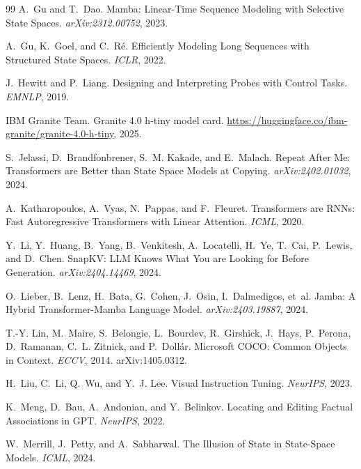 \begin{thebibliography}{99}
A.~Gu and T.~Dao.
\newblock Mamba: Linear-Time Sequence Modeling with Selective State Spaces.
\emph{arXiv:2312.00752}, 2023.

A.~Gu, K.~Goel, and C.~R\'e.
\newblock Efficiently Modeling Long Sequences with Structured State Spaces.
\emph{ICLR}, 2022.

J.~Hewitt and P.~Liang.
\newblock Designing and Interpreting Probes with Control Tasks.
\emph{EMNLP}, 2019.

IBM Granite Team.
\newblock Granite 4.0 h-tiny model card.
\newblock \url{https://huggingface.co/ibm-granite/granite-4.0-h-tiny}, 2025.

S.~Jelassi, D.~Brandfonbrener, S.~M. Kakade, and E.~Malach.
\newblock Repeat After Me: Transformers are Better than State Space Models at
Copying. \emph{arXiv:2402.01032}, 2024.

A.~Katharopoulos, A.~Vyas, N.~Pappas, and F.~Fleuret.
\newblock Transformers are RNNs: Fast Autoregressive Transformers with Linear
Attention. \emph{ICML}, 2020.

Y.~Li, Y.~Huang, B.~Yang, B.~Venkitesh, A.~Locatelli, H.~Ye, T.~Cai, P.~Lewis,
and D.~Chen.
\newblock SnapKV: LLM Knows What You are Looking for Before Generation.
\emph{arXiv:2404.14469}, 2024.

O.~Lieber, B.~Lenz, H.~Bata, G.~Cohen, J.~Osin, I.~Dalmedigos, et~al.
\newblock Jamba: A Hybrid Transformer-Mamba Language Model.
\emph{arXiv:2403.19887}, 2024.

T.-Y. Lin, M.~Maire, S.~Belongie, L.~Bourdev, R.~Girshick, J.~Hays, P.~Perona,
D.~Ramanan, C.~L. Zitnick, and P.~Doll\'ar.
\newblock Microsoft COCO: Common Objects in Context.
\newblock \emph{ECCV}, 2014. arXiv:1405.0312.

H.~Liu, C.~Li, Q.~Wu, and Y.~J. Lee.
\newblock Visual Instruction Tuning. \emph{NeurIPS}, 2023.

K.~Meng, D.~Bau, A.~Andonian, and Y.~Belinkov.
\newblock Locating and Editing Factual Associations in GPT.
\emph{NeurIPS}, 2022.

W.~Merrill, J.~Petty, and A.~Sabharwal.
\newblock The Illusion of State in State-Space Models. \emph{ICML}, 2024.


\end{thebibliography}
